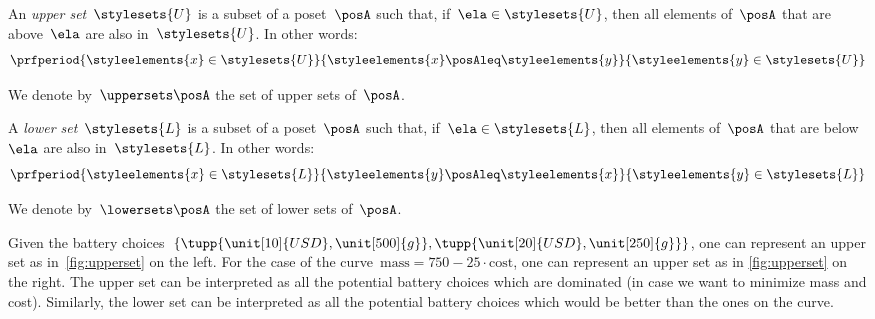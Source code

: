 
\begin{definition}
    \label{def:upperset}
    An \emph{upper set}~$\stylesets{U}$ is a subset of a poset~$\posA$ such that, if~$\ela \in \stylesets{U}$, then all elements of~$\posA$ that are above~$\ela$ are also in~$\stylesets{U}$.
    In other words:
    \begin{equation}
        \prfperiod{\styleelements{x}\in \stylesets{U}}{\styleelements{x}\posAleq \styleelements{y}}{\styleelements{y}\in \stylesets{U}}
    \end{equation}
\end{definition}
We denote by~$\uppersets \posA$ the set of upper sets of~$\posA$.

\begin{definition}
    \label{def:lowerset}
    A \emph{lower set}~$\stylesets{L}$ is a subset of a poset~$\posA$ such that, if~$\ela \in \stylesets{L}$, then all elements of~$\posA$ that are below~$\ela$ are also in~$\stylesets{L}$.
    In other words:
    \begin{equation}
        \prfperiod{\styleelements{x}\in \stylesets{L}}{\styleelements{y}\posAleq \styleelements{x}}{\styleelements{y}\in \stylesets{L}}
    \end{equation}
\end{definition}
We denote by~$\lowersets \posA$ the set of lower sets of~$\posA$.
%

Given the battery choices~$\{\tupp{\unit[10]{USD},\unit[500]{g}},\tupp{\unit[20]{USD},\unit[250]{g}}\}$, one can represent an upper set as in~\cref{fig:upperset} on the left.
For the case of the curve~$\text{mass}=750-25\cdot \text{cost}$, one can represent an upper set as in \cref{fig:upperset} on the right.
The upper set can be interpreted as all the potential battery choices which are dominated (in case we want to minimize mass and cost).
Similarly, the lower set can be interpreted as all the potential battery choices which would be better than the ones on the curve.

